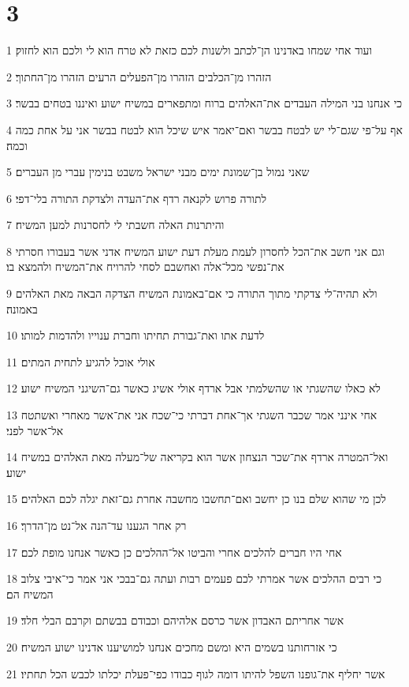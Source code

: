 \chapter{3}

\par 1 ועוד אחי שמחו באדנינו הן־לכתב ולשנות לכם כזאת לא טרח הוא לי ולכם הוא לחזוק׃
\par 2 הזהרו מן־הכלבים הזהרו מן־הפעלים הרעים הזהרו מן־החתוך׃
\par 3 כי אנחנו בני המילה העבדים את־האלהים ברוח ומתפארים במשיח ישוע ואיננו בטחים בבשר׃
\par 4 אף על־פי שגם־לי יש לבטח בבשר ואם־יאמר איש שיכל הוא לבטח בבשר אני על אחת כמה וכמה׃
\par 5 שאני נמול בן־שמונת ימים מבני ישראל משבט בנימין עברי מן העברים׃
\par 6 לתורה פרוש לקנאה רדף את־העדה ולצדקת התורה בלי־דפי׃
\par 7 והיתרנות האלה חשבתי לי לחסרנות למען המשיח׃
\par 8 וגם אני חשב את־הכל לחסרון לעמת מעלת דעת ישוע המשיח אדני אשר בעבורו חסרתי את־נפשי מכל־אלה ואחשבם לסחי להרויח את־המשיח ולהמצא בו׃
\par 9 ולא תהיה־לי צדקתי מתוך התורה כי אם־באמונת המשיח הצדקה הבאה מאת האלהים באמונה׃
\par 10 לדעת אתו ואת־גבורת תחיתו וחברת ענוייו ולהדמות למותו׃
\par 11 אולי אוכל להגיע לתחית המתים׃
\par 12 לא כאלו שהשגתי או שהשלמתי אבל ארדף אולי אשיג כאשר גם־השיגני המשיח ישוע׃
\par 13 אחי אינני אמר שכבר השגתי אך־אחת דברתי כי־שכח אני את־אשר מאחרי ואשתטח אל־אשר לפני׃
\par 14 ואל־המטרה ארדף את־שכר הנצחון אשר הוא בקריאה של־מעלה מאת האלהים במשיח ישוע׃
\par 15 לכן מי שהוא שלם בנו כן יחשב ואם־תחשבו מחשבה אחרת גם־זאת יגלה לכם האלהים׃
\par 16 רק אחר הגענו עד־הנה אל־נט מן־הדרך׃
\par 17 אחי היו חברים להלכים אחרי והביטו אל־ההלכים כן כאשר אנחנו מופת לכם׃
\par 18 כי רבים ההלכים אשר אמרתי לכם פעמים רבות ועתה גם־בבכי אני אמר כי־איבי צלוב המשיח הם׃
\par 19 אשר אחריתם האבדון אשר כרסם אלהיהם וכבודם בבשתם וקרבם הבלי חלד׃
\par 20 כי אזרחותנו בשמים היא ומשם מחכים אנחנו למושיענו אדנינו ישוע המשיח׃
\par 21 אשר יחליף את־גופנו השפל להיתו דומה לגוף כבודו כפי־פעלת יכלתו לכבש הכל תחתיו׃


